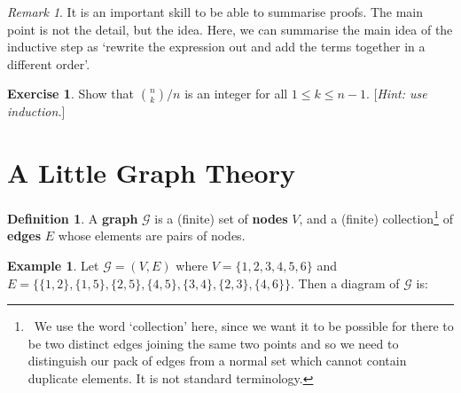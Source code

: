 \documentclass[a4paper, 10pt]{amsart}
\theoremstyle{definition}
\newtheorem{defn}[thm]{Definition}
\newtheorem{ex}[thm]{Example}
\newtheorem{exercise}[thm]{Exercise}
\theoremstyle{remark}
\newtheorem{rem}[thm]{Remark}
\begin{document}
\begin{rem}
  It is an important skill to be able to summarise proofs. The main point is not the detail, but the idea. Here, we can summarise
  the main idea of the inductive step as `rewrite the expression out and add the terms together in a different order'.
\end{rem}

\begin{exercise}
  Show that $ \binom{n}{k}/n $ is an integer for all $ 1 \leq k \leq n - 1 $. [\emph{Hint: use induction.}]
\end{exercise}

\section{A Little Graph Theory}
\begin{defn}
  A \textbf{graph} $ \mathcal{G} $ is a (finite) set of \textbf{nodes} $ V $, and a (finite) collection\footnote{~We use the word `collection'
  here, since we want it to be possible for there to be two distinct edges joining the same two points and so we need to distinguish our pack
  of edges from a normal set which cannot contain duplicate elements. It is not standard terminology.} of \textbf{edges} $ E $ whose
  elements are pairs of nodes.
\end{defn}

\begin{ex}\label{ex:graphg}
  Let $ \mathcal{G} = (V, E) $ where $ V = \{1, 2, 3, 4, 5, 6\} $ and $ E = \{\{1, 2\},\allowbreak \{1, 5\},\allowbreak \{2, 5\},\allowbreak
  \{4, 5\},\allowbreak \{3, 4\},\allowbreak \{2, 3\},\allowbreak \{4,6\}\} $. Then a diagram of $ \mathcal{G} $ is:
  \begin{center}
  \end{center}
\end{ex}
\end{document}
